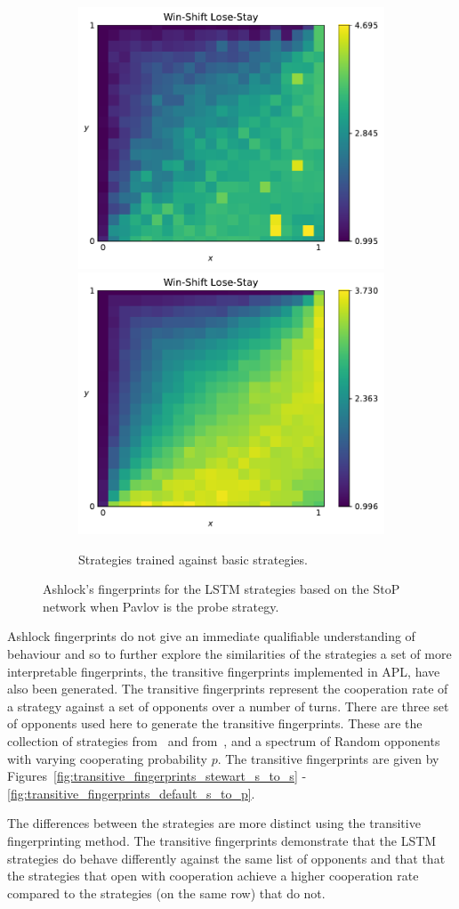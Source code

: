 \begin{figure}[!htbp]
\begin{subfigure}{\textwidth}
        \includegraphics[width=.3\textwidth]{src/chapters/07/img/win_shift_lose_stay_basic_classification_1.pdf}
        \includegraphics[width=.3\textwidth]{src/chapters/07/img/win_shift_lose_stay_basic_classification_0_78.pdf}
        \caption{Strategies trained against basic strategies.}
    \end{subfigure}
    \caption{Ashlock's fingerprints for the LSTM strategies based on the StoP
    network when Pavlov is the probe strategy.}\label{fig:ashlock_fingerprints_pavlov_s_to_p}
\end{figure}

Ashlock fingerprints do not give an immediate qualifiable understanding of behaviour and so
to further explore the similarities of the strategies a set of more
interpretable fingerprints, the transitive fingerprints implemented in APL, have
also been generated. The transitive fingerprints represent the cooperation rate
of a strategy against a set of opponents over a number of turns. There are three
set of opponents used here to generate the transitive fingerprints. These are
the collection of strategies from~\cite{Stewart2012} and
from~\cite{Beaufils1997}, and a spectrum of Random opponents with varying cooperating
probability \(p\). The transitive fingerprints are given by
Figures~\ref{fig:transitive_fingerprints_stewart_s_to_s}
-\ref{fig:transitive_fingerprints_default_s_to_p}.

The differences between the strategies are more distinct using the transitive
fingerprinting method. The transitive fingerprints demonstrate that the LSTM
strategies do behave differently against the same list of opponents and that
that the strategies that open with cooperation achieve a higher cooperation rate
compared to the strategies (on the same row) that do not.

